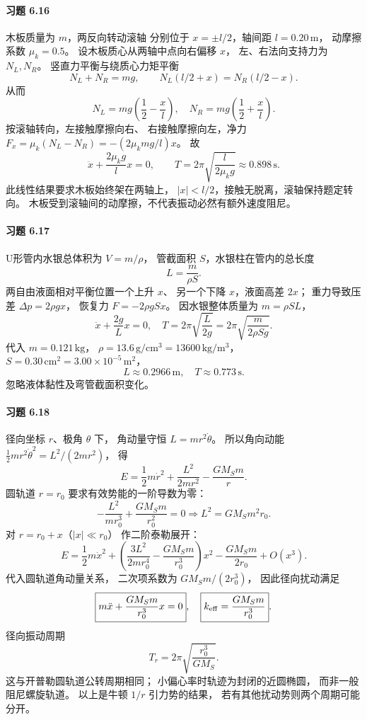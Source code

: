 \paragraph{习题 6.16}
木板质量为 \(m\)，两反向转动滚轴
分别位于
\(x=\pm l/2\)，轴间距
\(l=0.20\,\mathrm m\)，
动摩擦系数
\(\mu_k=0.5\)。
设木板质心从两轴中点向右偏移 \(x\)，
左、右法向支持力为 \(N_L,N_R\)。
竖直力平衡与绕质心力矩平衡
\[
 N_L+N_R=mg,\qquad
 N_L(l/2+x)=N_R(l/2-x).
\]
从而
\[
 N_L=mg\left(\frac12-\frac{x}{l}\right),\quad
 N_R=mg\left(\frac12+\frac{x}{l}\right).
\]
按滚轴转向，左接触摩擦向右、
右接触摩擦向左，净力
\(F_x=\mu_k(N_L-N_R)
 =-(2\mu_kmg/l)x\)。
故
\[
 \boxed{\ddot x+\frac{2\mu_kg}{l}x=0},\qquad
 \boxed{T=2\pi\sqrt{\frac{l}{2\mu_kg}}
 \approx0.898\,\mathrm s}.
\]
此线性结果要求木板始终架在两轴上，
\(|x|<l/2\)，接触无脱离，滚轴保持题定转向。
木板受到滚轴间的动摩擦，不代表振动必然有额外速度阻尼。

\paragraph{习题 6.17}
U形管内水银总体积为 \(V=m/\rho\)，
管截面积 \(S\)，水银柱在管内的总长度
\[
 L=\frac{m}{\rho S}.
\]
两自由液面相对平衡位置一个上升 \(x\)、
另一个下降 \(x\)，液面高差 \(2x\)；
重力导致压差
\(\Delta p=2\rho gx\)，
恢复力 \(F=-2\rho g Sx\)。
因水银整体质量为 \(m=\rho SL\)，
\[
 \boxed{\ddot x+\frac{2g}{L}x=0},\quad
 \boxed{T=2\pi\sqrt{\frac{L}{2g}}
 =2\pi\sqrt{\frac{m}{2\rho Sg}}}.
\]
代入
\(m=0.121\,\mathrm{kg}\)，
\(\rho=13.6\,\mathrm{g/cm^3}=13600\,\mathrm{kg/m^3}\)，
\(S=0.30\,\mathrm{cm^2}=3.00\times10^{-5}\,\mathrm{m^2}\)，
\[
 \boxed{L\approx0.2966\,\mathrm m,\quad
 T\approx0.773\,\mathrm s}.
\]
忽略液体黏性及弯管截面积变化。

\paragraph{习题 6.18}
径向坐标 \(r\)、极角 \(\theta\) 下，
角动量守恒
\(L=mr^2\dot\theta\)。
所以角向动能
\(\tfrac12mr^2\dot\theta^2=L^2/(2mr^2)\)，
得
\[
 \boxed{E=\frac12m\dot r^2+
 \frac{L^2}{2mr^2}-\frac{GM_Sm}{r}}.
\]
圆轨道 \(r=r_0\) 要求有效势能的一阶导数为零：
\[
 -\frac{L^2}{mr_0^3}
 +\frac{GM_Sm}{r_0^2}=0
 \Longrightarrow
 L^2=GM_Sm^2r_0.
\]
对 \(r=r_0+x\)（\(|x|\ll r_0\)）
作二阶泰勒展开：
\[
 \boxed{E=\frac12m\dot x^2+
 \left(\frac{3L^2}{2mr_0^4}
 -\frac{GM_Sm}{r_0^3}\right)x^2
 -\frac{GM_Sm}{2r_0}+O(x^3)}.
\]
代入圆轨道角动量关系，
二次项系数为
\(GM_Sm/(2r_0^3)\)，
因此径向扰动满足
\[
 \boxed{m\ddot x+
 \frac{GM_Sm}{r_0^3}x=0},\quad
 \boxed{k_{\rm eff}=\frac{GM_Sm}{r_0^3}}.
\]
径向振动周期
\[
 \boxed{T_r=2\pi\sqrt{\frac{r_0^3}{GM_S}}}.
\]
这与开普勒圆轨道公转周期相同；
小偏心率时轨迹为封闭的近圆椭圆，
而非一般阻尼螺旋轨道。
以上是牛顿 \(1/r\) 引力势的结果，
若有其他扰动势则两个周期可能分开。

